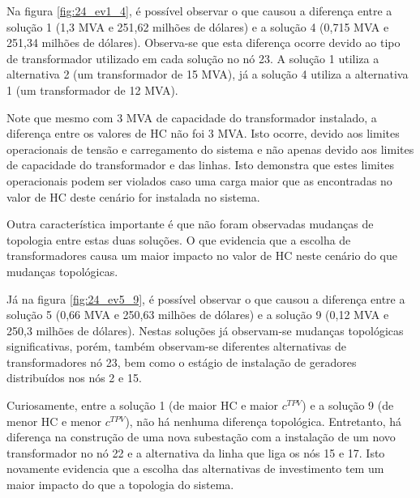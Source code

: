 Na figura \ref{fig:24_ev1_4}, é possível observar o que causou a diferença entre a solução 1 (1,3 MVA e 251,62 milhões de dólares) e a solução 4 (0,715 MVA e 251,34 milhões de dólares). Observa-se que esta diferença ocorre devido ao tipo de transformador utilizado em cada solução no nó 23. A solução 1 utiliza a alternativa 2 (um transformador de 15 MVA), já a solução 4 utiliza a alternativa 1 (um transformador de 12 MVA).

Note que mesmo com 3 MVA de capacidade do transformador instalado, a diferença entre os valores de \ac{HC} não foi 3 MVA. Isto ocorre, devido aos limites operacionais de tensão e carregamento do sistema e não apenas devido aos limites de capacidade do transformador e das linhas.  Isto demonstra que estes limites operacionais podem ser violados caso uma carga maior que as encontradas no valor de \ac{HC} deste cenário for instalada no sistema.

Outra característica importante é que não foram observadas mudanças de topologia entre estas duas soluções. O que evidencia que a escolha de transformadores causa um maior impacto no valor de \ac{HC} neste cenário do que mudanças topológicas.

Já na figura \ref{fig:24_ev5_9}, é possível observar o que causou a diferença entre a solução 5 (0,66 MVA e 250,63 milhões de dólares) e a solução 9 (0,12 MVA e 250,3 milhões de dólares). Nestas soluções já observam-se mudanças topológicas significativas, porém, também  observam-se diferentes alternativas de transformadores nó 23, bem como o estágio  de instalação de geradores distribuídos nos nós 2 e 15.

Curiosamente, entre a solução 1 (de maior \ac{HC} e maior $c^{TPV}$) e a solução 9 (de menor \ac{HC} e menor $c^{TPV}$), não há nenhuma diferença topológica. Entretanto, há diferença na construção de uma nova subestação com a instalação de um novo transformador no nó 22 e a alternativa da linha que liga os nós 15 e 17. Isto novamente evidencia que a escolha das alternativas de investimento tem um maior impacto do que a topologia do sistema.

